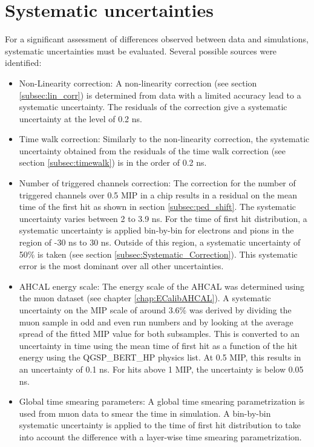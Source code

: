 \section{Systematic uncertainties}

For a significant assessment of differences observed between data and simulations, systematic uncertainties must be evaluated. Several possible sources were identified:

\begin{itemize}
	\item Non-Linearity correction: A non-linearity correction (see section \ref{subsec:lin_corr}) is determined from data with a limited accuracy lead to a systematic uncertainty. The residuals of the correction give a systematic uncertainty at the level of 0.2 ns.
	\item Time walk correction: Similarly to the non-linearity correction, the systematic uncertainty obtained from the residuals of the time walk correction (see section \ref{subsec:timewalk}) is in the order of 0.2 ns.
	\item Number of triggered channels correction: The correction for the number of triggered channels over 0.5 MIP in a chip results in a residual on the mean time of the first hit as shown in section \ref{subsec:ped_shift}. The systematic uncertainty varies between 2 to 3.9 ns. For the time of first hit distribution, a systematic uncertainty is applied bin-by-bin for electrons and pions in the region of -30 ns to 30 ns. Outside of this region, a systematic uncertainty of 50\% is taken (see section \ref{subsec:Systematic_Correction}). This systematic error is the most dominant over all other uncertainties.
	\item AHCAL energy scale: The energy scale of the AHCAL was determined using the muon dataset (see chapter \ref{chap:ECalibAHCAL}). A systematic uncertainty on the MIP scale of around 3.6\% was derived by dividing the muon sample in odd and even run numbers and by looking at the average spread of the fitted MIP value for both subsamples. This is converted to an uncertainty in time using the mean time of first hit as a function of the hit energy using the QGSP\_BERT\_HP physics list. At 0.5 MIP, this results in an uncertainty of 0.1 ns. For hits above 1 MIP, the uncertainty is below 0.05 ns.
	\item Global time smearing parameters: A global time smearing parametrization is used from muon data to smear the time in simulation. A bin-by-bin systematic uncertainty is applied to the time of first hit distribution to take into account the difference with a layer-wise time smearing parametrization.

\end{itemize}
